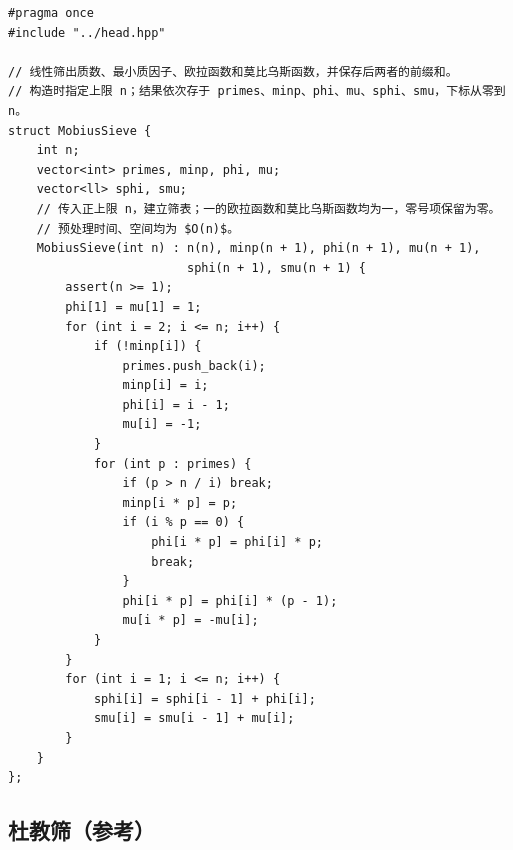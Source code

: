 \begin{lstlisting}
#pragma once
#include "../head.hpp"

// 线性筛出质数、最小质因子、欧拉函数和莫比乌斯函数，并保存后两者的前缀和。
// 构造时指定上限 n；结果依次存于 primes、minp、phi、mu、sphi、smu，下标从零到 n。
struct MobiusSieve {
    int n;
    vector<int> primes, minp, phi, mu;
    vector<ll> sphi, smu;
    // 传入正上限 n，建立筛表；一的欧拉函数和莫比乌斯函数均为一，零号项保留为零。
    // 预处理时间、空间均为 $O(n)$。
    MobiusSieve(int n) : n(n), minp(n + 1), phi(n + 1), mu(n + 1),
                         sphi(n + 1), smu(n + 1) {
        assert(n >= 1);
        phi[1] = mu[1] = 1;
        for (int i = 2; i <= n; i++) {
            if (!minp[i]) {
                primes.push_back(i);
                minp[i] = i;
                phi[i] = i - 1;
                mu[i] = -1;
            }
            for (int p : primes) {
                if (p > n / i) break;
                minp[i * p] = p;
                if (i % p == 0) {
                    phi[i * p] = phi[i] * p;
                    break;
                }
                phi[i * p] = phi[i] * (p - 1);
                mu[i * p] = -mu[i];
            }
        }
        for (int i = 1; i <= n; i++) {
            sphi[i] = sphi[i - 1] + phi[i];
            smu[i] = smu[i - 1] + mu[i];
        }
    }
};
\end{lstlisting}

\subsection{杜教筛（参考）}
\par

